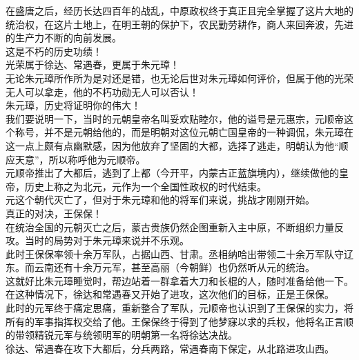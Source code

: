 \begin{multicols}{\theparacolNo}
在盛唐之后，经历长达四百年的战乱，中原政权终于真正且完全掌握了这片大地的统治权，在这片土地上，在明王朝的保护下，农民勤劳耕作，商人来回奔波，先进的生产力不断的向前发展。\\

这是不朽的历史功绩！\\

光荣属于徐达、常遇春，更属于朱元璋！\\

无论朱元璋所作所为是对还是错，也无论后世对朱元璋如何评价，但属于他的光荣无人可以拿走，他的不朽功勋无人可以否认！\\

朱元璋，历史将证明你的伟大！\\

我们要说明一下，当时的元朝皇帝名叫妥欢贴睦尔，他的谥号是元惠宗，元顺帝这个称号，并不是元朝给他的，而是明朝对这位元朝亡国皇帝的一种调侃，朱元璋在这一点上颇有点幽默感，因为他放弃了坚固的大都，选择了逃走，明朝认为他“顺应天意”，所以称呼他为元顺帝。\\

元顺帝推出了大都后，逃到了上都（今开平，内蒙古正蓝旗境内），继续做他的皇帝，历史上称之为北元，元作为一个全国性政权的时代结束。\\

元这个朝代灭亡了，但对于朱元璋和他的将军们来说，挑战才刚刚开始。\\

真正的对决，王保保！\\

在统治全国的元朝灭亡之后，蒙古贵族仍然企图重新入主中原，不断组织力量反攻。当时的局势对于朱元璋来说并不乐观。\\

此时王保保率领十余万军队，占据山西、甘肃。丞相纳哈出带领二十余万军队守辽东。而云南还有十余万元军，甚至高丽（今朝鲜）也仍然听从元的统治。\\

这就好比朱元璋睡觉时，帮边站着一群拿着大刀和长棍的人，随时准备给他一下。\\

在这种情况下，徐达和常遇春又开始了进攻，这次他们的目标，正是王保保。\\

此时的元军终于痛定思痛，重新整合了军队，元顺帝也认识到了王保保的实力，将所有的军事指挥权交给了他。王保保终于得到了他梦寐以求的兵权，他将名正言顺的带领精锐元军与统领明军的明朝第一名将徐达决战。\\

徐达、常遇春在攻下大都后，分兵两路，常遇春南下保定，从北路进攻山西。\\


\end{multicols}
